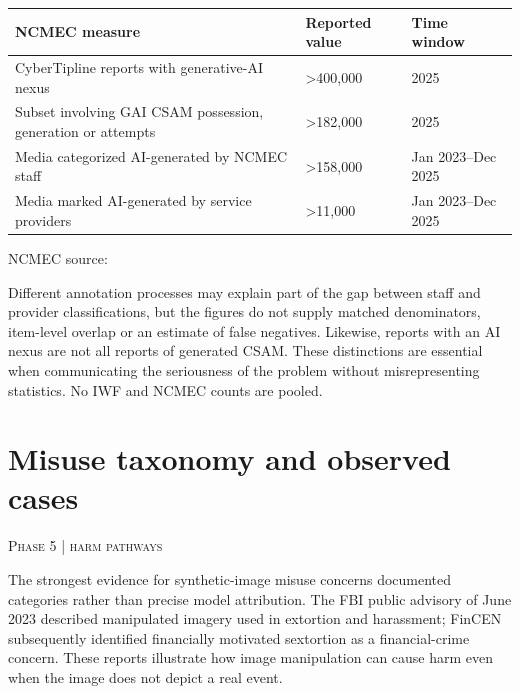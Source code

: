 \documentclass[11pt,a4paper]{article}
\newcommand{\sect}[2]{\section{#1}\textcolor{muted}{\small\textsc{#2}}\par\vspace{2mm}}
\begin{document}
\begin{center}\small\begin{tabularx}{\linewidth}{@{}YYY@{}}\toprule
\textbf{NCMEC measure} & \textbf{Reported value} & \textbf{Time window}\\\midrule
CyberTipline reports with generative-AI nexus & >400,000 & 2025\\
Subset involving GAI CSAM possession, generation or attempts & >182,000 & 2025\\
Media categorized AI-generated by NCMEC staff & >158,000 & Jan 2023--Dec 2025\\
Media marked AI-generated by service providers & >11,000 & Jan 2023--Dec 2025\\\bottomrule\end{tabularx}\end{center}

NCMEC source:  \cite{ncmec,ncmec25}


Different annotation processes may explain part of the gap between staff and provider classifications, but the figures do not supply matched denominators, item-level overlap or an estimate of false negatives. Likewise, reports with an AI nexus are not all reports of generated CSAM. These distinctions are essential when communicating the seriousness of the problem without misrepresenting statistics. No IWF and NCMEC counts are pooled.


\clearpage\sect{Misuse taxonomy and observed cases}{Phase 5 | harm pathways}

The strongest evidence for synthetic-image misuse concerns documented categories rather than precise model attribution. The FBI public advisory of June 2023 described manipulated imagery used in extortion and harassment; FinCEN subsequently identified financially motivated sextortion as a financial-crime concern. These reports illustrate how image manipulation can cause harm even when the image does not depict a real event. \cite{fbi,fincen}
\end{document}
